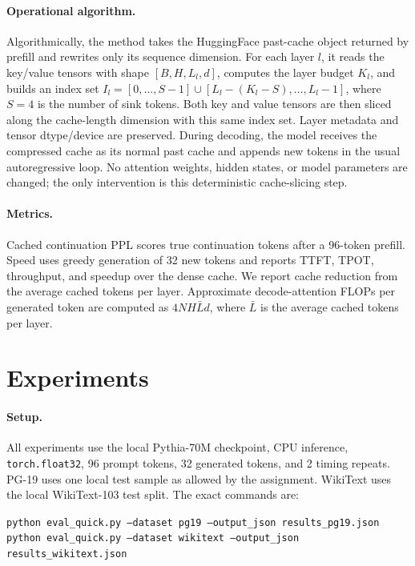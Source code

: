 \documentclass{article}
\begin{document}
\paragraph{Operational algorithm.}
Algorithmically, the method takes the HuggingFace past-cache object returned by
prefill and rewrites only its sequence dimension.  For each layer $l$, it reads
the key/value tensors with shape $[B,H,L_l,d]$, computes the layer budget $K_l$,
and builds an index set
$I_l=[0,\ldots,S-1]\cup[L_l-(K_l-S),\ldots,L_l-1]$, where $S=4$ is the number of
sink tokens.  Both key and value tensors are then sliced along the cache-length
dimension with this same index set.  Layer metadata and tensor dtype/device are
preserved.  During decoding, the model receives the compressed cache as its
normal past cache and appends new tokens in the usual autoregressive loop.  No
attention weights, hidden states, or model parameters are changed; the only
intervention is this deterministic cache-slicing step.

\paragraph{Metrics.}
Cached continuation PPL scores true continuation tokens after a 96-token
prefill.  Speed uses greedy generation of 32 new tokens and reports TTFT,
TPOT, throughput, and speedup over the dense cache.  We report cache reduction
from the average cached tokens per layer.  Approximate decode-attention FLOPs
per generated token are computed as $4NH\bar{L}d$, where $\bar{L}$ is the
average cached tokens per layer.

\section{Experiments}

\paragraph{Setup.}
All experiments use the local Pythia-70M checkpoint, CPU inference,
\texttt{torch.float32}, 96 prompt tokens, 32 generated tokens, and 2 timing
repeats.  PG-19 uses one local test sample as allowed by the assignment.
WikiText uses the local WikiText-103 test split.  The exact commands are:
\begin{center}
\small
\texttt{python eval\_quick.py --dataset pg19 --output\_json results\_pg19.json}\\
\texttt{python eval\_quick.py --dataset wikitext --output\_json results\_wikitext.json}
\end{center}
\end{document}
